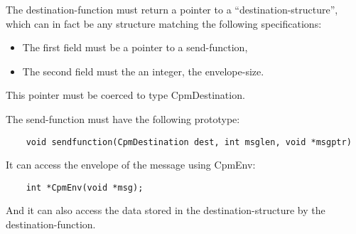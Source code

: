 The destination-function must return a pointer to a
``destination-structure'', which can in fact be any structure matching
the following specifications:

\begin{itemize}
\item{The first field must be a pointer to a send-function,}
\item{The second field must the an integer, the envelope-size.}
\end{itemize}

This pointer must be coerced to type CpmDestination.

The send-function must have the following prototype:

\begin{verbatim}
    void sendfunction(CpmDestination dest, int msglen, void *msgptr)
\end{verbatim}

It can access the envelope of the message using CpmEnv:

\begin{verbatim}
    int *CpmEnv(void *msg);
\end{verbatim}

And it can also access the data stored in the destination-structure
by the destination-function.

